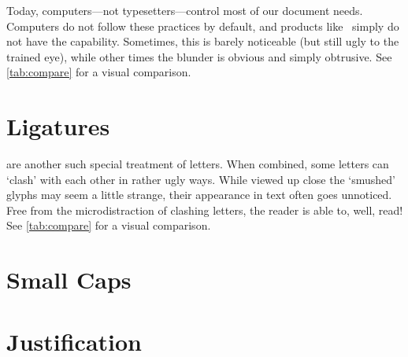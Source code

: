 \documentclass{article}
\begin{document}
Today, computers---not typesetters---control most of our document needs.
Computers do not follow these practices by default,
  and products like \MicrosoftWord\ simply do not have the capability.
Sometimes, this is barely noticeable (but still ugly to the trained eye),
  while other times the blunder is obvious and simply obtrusive.
See \autoref{tab:compare} for a visual comparison.



\section{Ligatures}
\label{sec:ligatures}

 are another such special treatment of letters.
When combined, some letters can `clash' with each other in rather ugly ways.
While viewed up close the `smushed' glyphs may seem a little strange,
  their appearance in text often goes unnoticed.
Free from the microdistraction of clashing letters,
  the reader is able to, well, read!
See \autoref{tab:compare} for a visual comparison.

\section{Small Caps}
\label{sec:small-caps}

\section{Justification}
\label{sec:justification}


\appendix
\end{document}
